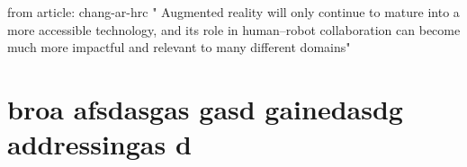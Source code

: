 from article: chang-ar-hrc
" Augmented reality will only continue to mature into
a more accessible technology, and its role in human–robot collaboration can become much
more impactful and relevant to many different domains"


\section{broa
afsdasgas
gasd
gainedasdg
addressingas
d}





